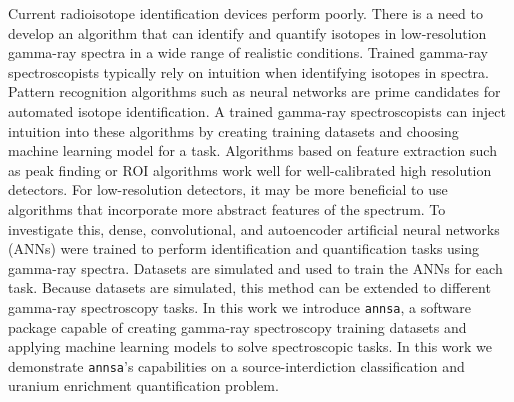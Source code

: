 Current radioisotope identification devices perform poorly. There is a need to develop an algorithm that can identify and quantify isotopes in low-resolution gamma-ray spectra in a wide range of realistic conditions. Trained gamma-ray spectroscopists typically rely on intuition when identifying isotopes in spectra. Pattern recognition algorithms such as neural networks are prime candidates for automated isotope identification. A trained gamma-ray spectroscopists can inject intuition into these algorithms by creating training datasets and choosing machine learning model for a task. Algorithms based on feature extraction such as peak finding or ROI algorithms work well for well-calibrated high resolution detectors. For low-resolution detectors, it may be more beneficial to use algorithms that incorporate more abstract features of the spectrum. To investigate this, dense, convolutional, and autoencoder artificial neural networks (ANNs) were trained to perform identification and quantification tasks using gamma-ray spectra. Datasets are simulated and used to train the ANNs for each task. Because datasets are simulated, this method can be extended to different gamma-ray spectroscopy tasks. In this work we introduce \verb|annsa|, a software package capable of creating gamma-ray spectroscopy training datasets and applying machine learning models to solve spectroscopic tasks. In this work we demonstrate \verb|annsa|'s capabilities on a source-interdiction classification and uranium enrichment quantification problem.


